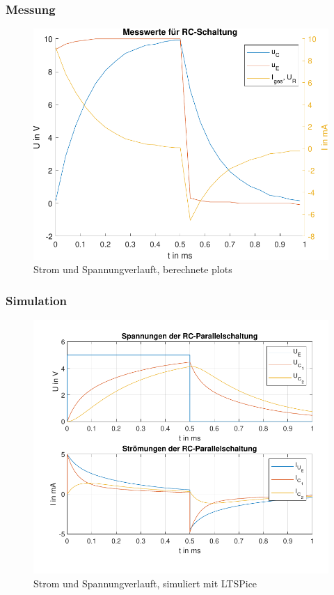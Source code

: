 \subsubsection{Messung}
\begin{figure}[H]
    \centering
    \includegraphics{src/messwerte.pdf}
    \caption{Strom und Spannungverlauft, berechnete plots}
    \label{fig:my_label}
\end{figure}

\subsubsection{Simulation}
\begin{figure}[H]
    \centering
    \includegraphics{src/labor2pdf.pdf}
    \caption{Strom und Spannungverlauft, simuliert mit LTSPice}
    \label{fig:my_label2}
\end{figure}
%
%
%
%
%
%
%